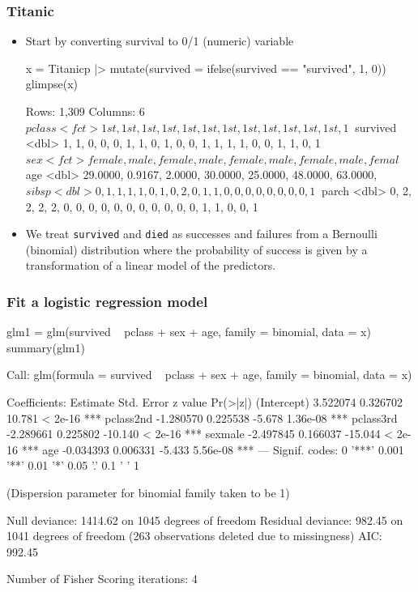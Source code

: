 \documentclass[a4paper]{article}
\begin{document}
\subsubsection{Titanic}
\begin{itemize}
	\item Start by converting survival to 0/1 (numeric) variable
\begin{Schunk}
\begin{Sinput}
x = Titanicp |> mutate(survived = ifelse(survived == "survived", 1, 0))
glimpse(x)
\end{Sinput}
\begin{Soutput}
Rows: 1,309
Columns: 6
$ pclass   <fct> 1st, 1st, 1st, 1st, 1st, 1st, 1st, 1st, 1st, 1st, 1st, 1st, 1~
$ survived <dbl> 1, 1, 0, 0, 0, 1, 1, 0, 1, 0, 0, 1, 1, 1, 1, 0, 0, 1, 1, 0, 1~
$ sex      <fct> female, male, female, male, female, male, female, male, femal~
$ age      <dbl> 29.0000, 0.9167, 2.0000, 30.0000, 25.0000, 48.0000, 63.0000, ~
$ sibsp    <dbl> 0, 1, 1, 1, 1, 0, 1, 0, 2, 0, 1, 1, 0, 0, 0, 0, 0, 0, 0, 0, 1~
$ parch    <dbl> 0, 2, 2, 2, 2, 0, 0, 0, 0, 0, 0, 0, 0, 0, 0, 0, 1, 1, 0, 0, 1~
\end{Soutput}
\end{Schunk}
	\item We treat \lstinline|survived| and \lstinline|died| as successes and failures from a Bernoulli (binomial) distribution where the probability of success is given by a transformation of a linear model of the predictors.
\end{itemize}
\subsubsection{Fit a logistic regression model}
\begin{Schunk}
\begin{Sinput}
glm1 = glm(survived ~ pclass + sex + age, family = binomial, data = x)
summary(glm1)
\end{Sinput}
\begin{Soutput}

Call:
glm(formula = survived ~ pclass + sex + age, family = binomial, 
    data = x)

Coefficients:
             Estimate Std. Error z value Pr(>|z|)    
(Intercept)  3.522074   0.326702  10.781  < 2e-16 ***
pclass2nd   -1.280570   0.225538  -5.678 1.36e-08 ***
pclass3rd   -2.289661   0.225802 -10.140  < 2e-16 ***
sexmale     -2.497845   0.166037 -15.044  < 2e-16 ***
age         -0.034393   0.006331  -5.433 5.56e-08 ***
---
Signif. codes:  0 '***' 0.001 '**' 0.01 '*' 0.05 '.' 0.1 ' ' 1

(Dispersion parameter for binomial family taken to be 1)

    Null deviance: 1414.62  on 1045  degrees of freedom
Residual deviance:  982.45  on 1041  degrees of freedom
  (263 observations deleted due to missingness)
AIC: 992.45

Number of Fisher Scoring iterations: 4
\end{Soutput}
\end{Schunk}
\end{document}
